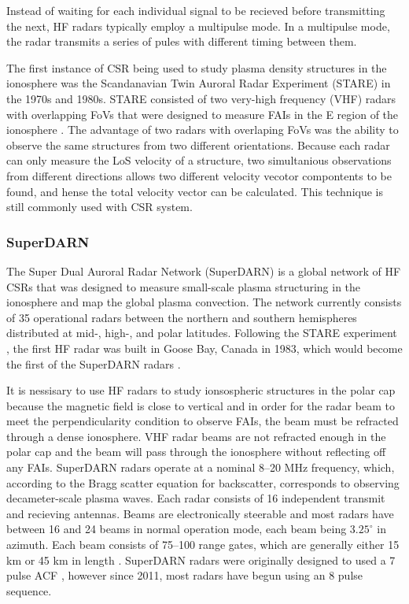 Instead of waiting for each individual signal to be recieved before transmitting the next, HF radars typically employ a multipulse mode. In a multipulse mode, the radar transmits a series of pules with different timing between them.  

The first instance of CSR being used to study plasma density structures in the ionosphere was the Scandanavian Twin Auroral Radar Experiment (STARE) in the 1970s and 1980s.  STARE consisted of two very-high frequency (VHF) radars with overlapping FoVs that were designed to measure FAIs in the E region of the ionosphere \citep{Greenwald1997}.  The advantage of two radars with overlaping FoVs was the ability to observe the same structures from two different orientations.  Because each radar can only measure the LoS velocity of a structure, two simultanious observations from different directions allows two different velocity vecotor compontents to be found, and hense the total velocity vector can be calculated.  This technique is still commonly used with CSR system.


\subsubsection{SuperDARN}
\label{sec:superdarn}
The Super Dual Auroral Radar Network (SuperDARN) is a global network of HF CSRs that was designed to measure small-scale plasma structuring in the ionosphere and map the global plasma convection.  The network currently consists of 35 operational radars between the northern and southern hemispheres distributed at mid-, high-, and polar latitudes.  Following the STARE experiment \citep{Greenwald1978}, the first HF radar was built in Goose Bay, Canada in 1983, which would become the first of the SuperDARN radars \citep{Greenwald1985}.  

It is nessisary to use HF radars to study ionsospheric structures in the polar cap because the magnetic field is close to vertical and in order for the radar beam to meet the perpendicularity condition to observe FAIs, the beam must be refracted through a dense ionosphere.  VHF radar beams are not refracted enough in the polar cap and the beam will pass through the ionosphere without reflecting off any FAIs.  SuperDARN radars operate at a nominal 8--20 MHz frequency, which, according to the Bragg scatter equation for backscatter, corresponds to observing decameter-scale plasma waves.  Each radar consists of 16 independent transmit and recieving antennas.  Beams are electronically steerable and most radars have between 16 and 24 beams in normal operation mode, each beam being \(3.25^\circ\) in azimuth.  Each beam consists of 75--100 range gates, which are generally either 15 km or 45 km in length \citep{Chisham2007}.  SuperDARN radars were originally designed to used a 7 pulse ACF \citep{Farley1972,Greenwald1983,Greenwald1985}, however since 2011, most radars have begun using an 8 pulse sequence.

